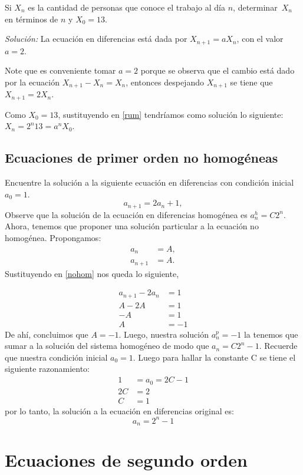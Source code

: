 \documentclass{report}
\begin{document}
Si $X_n$ es la cantidad de personas que conoce el trabajo al día  $n$,
determinar~$X_n$ en términos de $n$ y $X_0=13$.

\textit{Solución:} La ecuación en diferencias está dada por
$X_{n+1}=aX_n$, con el valor~$a=2$.

Note que es conveniente tomar $a=2$ porque se observa que el cambio
está dado por la ecuación $X_{n+1}-X_{n}=X_{n}$, entonces despejando
$X_{n+1}$ se tiene que~$X_{n+1}=2X_n$.

Como $X_0=13$, sustituyendo en \ref{rum} tendríamos como solución lo
siguiente: $X_n=2^n13=a^nX_0$.


\section{Ecuaciones de primer orden no homogéneas}
Encuentre la solución a la siguiente ecuación en diferencias con
condición inicial $a_{0}=1$.
\begin{equation}
  \label{nohom}
  a_{n+1}=2a_{n}+1,
\end{equation}
Observe que la solución de la ecuación en diferencias homogénea es
$a_{n}^h=C2^n$.  Ahora, tenemos que proponer una solución particular a
la ecuación no homogénea.  Propongamos:
\begin{align*}
 a_n&=A,\\
  a_{n+1}&=A.
\end{align*}
Sustituyendo en \ref{nohom} nos queda lo siguiente,

\begin{align*}
  a_{n+1}-2a_{n}&=1\\
  A-2A&=1\\
  -A&=1\\
  A&=-1
\end{align*}
De ahí, concluimos que $A=-1$.  Luego, nuestra solución $a_n^p=-1$ la
tenemos que sumar a la solución del sistema homogéneo de modo que
$a_{n}=C2^n-1$.  Recuerde que nuestra condición inicial
$a_{0}=1$. Luego para hallar la constante C se tiene el siguiente
razonamiento:
\begin{align*}
1&=a_{0}=2C-1\\
2C&=2\\
  C&=1
\end{align*}  
por lo tanto, la solución a la ecuación en diferencias original es:
$$a_{n}=2^n-1$$


\chapter{Ecuaciones de segundo orden}
\end{document}
